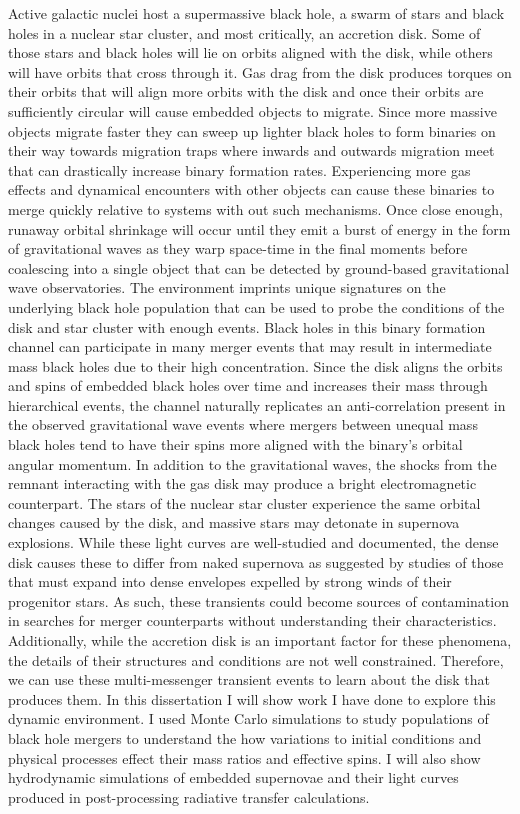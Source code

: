 Active galactic nuclei host a supermassive black hole, a swarm of stars and black holes in a nuclear star cluster, and most critically, an accretion disk.
Some of those stars and black holes will lie on orbits aligned with the disk, while others will have orbits that cross through it.
Gas drag from the disk produces torques on their orbits that will align more orbits with the disk and once their orbits are sufficiently circular will cause embedded objects to migrate.
Since more massive objects migrate faster they can sweep up lighter black holes to form binaries on their way towards migration traps where inwards and outwards migration meet that can drastically increase binary formation rates.
Experiencing more gas effects and dynamical encounters with other objects can cause these binaries to merge quickly relative to systems with out such mechanisms.
Once close enough, runaway orbital shrinkage will occur until they emit a burst of energy in the form of gravitational waves as they warp space-time in the final moments before coalescing into a single object that can be detected by ground-based gravitational wave observatories.
The environment imprints unique signatures on the underlying black hole population that can be used to probe the conditions of the disk and star cluster with enough events.
Black holes in this binary formation channel can participate in many merger events that may result in intermediate mass black holes due to their high concentration.
Since the disk aligns the orbits and spins of embedded black holes over time and increases their mass through hierarchical events, the channel naturally replicates an anti-correlation present in the observed gravitational wave events where mergers between unequal mass black holes tend to have their spins more aligned with the binary's orbital angular momentum.
In addition to the gravitational waves, the shocks from the remnant interacting with the gas disk may produce a bright electromagnetic counterpart.
The stars of the nuclear star cluster experience the same orbital changes caused by the disk, and massive stars may detonate in supernova explosions.
While these light curves are well-studied and documented, the dense disk causes these to differ from naked supernova as suggested by studies of those that must expand into dense envelopes expelled by strong winds of their progenitor stars.
As such, these transients could become sources of contamination in searches for merger counterparts without understanding their characteristics.
Additionally, while the accretion disk is an important factor for these phenomena, the details of their structures and conditions are not well constrained.
Therefore, we can use these multi-messenger transient events to learn about the disk that produces them.
In this dissertation I will show work I have done to explore this dynamic environment.
I used Monte Carlo simulations to study populations of black hole mergers to understand the how variations to initial conditions and physical processes effect their mass ratios and effective spins.
I will also show hydrodynamic simulations of embedded supernovae and their light curves produced in post-processing radiative transfer calculations.

